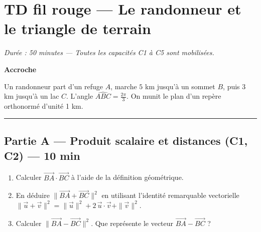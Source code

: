 

\section*{TD fil rouge — Le randonneur et le triangle de terrain}

\textit{Durée : 50 minutes — Toutes les capacités C1 à C5 sont mobilisées.}

\bigskip

\begin{center}
\textbf{Accroche}

\medskip
\parbox{0.9\textwidth}{Un randonneur part d'un refuge $A$, marche $5$ km jusqu'à un sommet $B$, puis $3$ km jusqu'à un lac $C$. L'angle $\widehat{ABC} = \frac{2\pi}{3}$. On munit le plan d'un repère orthonormé d'unité 1 km.}
\end{center}

\bigskip

\hrule

\bigskip

\subsection*{Partie A — Produit scalaire et distances (C1, C2) — 10 min}

\begin{enumerate}
  \item Calculer $\overrightarrow{BA} \cdot \overrightarrow{BC}$ à l'aide de la définition géométrique.
  \item En déduire $\|\overrightarrow{BA} + \overrightarrow{BC}\|^2$ en utilisant l'identité remarquable vectorielle $\|\vec{u} + \vec{v}\|^2 = \|\vec{u}\|^2 + 2\,\vec{u} \cdot \vec{v} + \|\vec{v}\|^2$.
  \item Calculer $\|\overrightarrow{BA} - \overrightarrow{BC}\|^2$. Que représente le vecteur $\overrightarrow{BA} - \overrightarrow{BC}$ ?
\end{enumerate}

